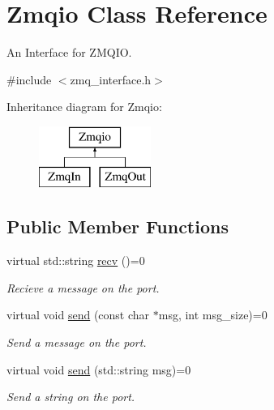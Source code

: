\hypertarget{classZmqio}{\section{Zmqio Class Reference}
\label{classZmqio}
}


An Interface for Z\-M\-Q\-I\-O.  




{\ttfamily \#include $<$zmq\-\_\-interface.\-h$>$}

Inheritance diagram for Zmqio\-:\begin{figure}[H]
\begin{center}
\leavevmode
\includegraphics[height=2.000000cm]{classZmqio}
\end{center}
\end{figure}
\subsection*{Public Member Functions}
\begin{DoxyCompactItemize}
\item 
\hypertarget{classZmqio_a9365ac0ed42905898502e16857997acc}{virtual std\-::string \hyperlink{classZmqio_a9365ac0ed42905898502e16857997acc}{recv} ()=0}\label{classZmqio_a9365ac0ed42905898502e16857997acc}

\begin{DoxyCompactList}\small\item\em Recieve a message on the port. \end{DoxyCompactList}\item 
\hypertarget{classZmqio_a858e00e8ac5c4d1d60c665fa7c0716f0}{virtual void \hyperlink{classZmqio_a858e00e8ac5c4d1d60c665fa7c0716f0}{send} (const char $\ast$msg, int msg\-\_\-size)=0}\label{classZmqio_a858e00e8ac5c4d1d60c665fa7c0716f0}

\begin{DoxyCompactList}\small\item\em Send a message on the port. \end{DoxyCompactList}\item 
\hypertarget{classZmqio_a079f5752b553ddb2e5a2da565bcf162c}{virtual void \hyperlink{classZmqio_a079f5752b553ddb2e5a2da565bcf162c}{send} (std\-::string msg)=0}\label{classZmqio_a079f5752b553ddb2e5a2da565bcf162c}

\begin{DoxyCompactList}\small\item\em Send a string on the port. \end{DoxyCompactList}\end{DoxyCompactItemize}


